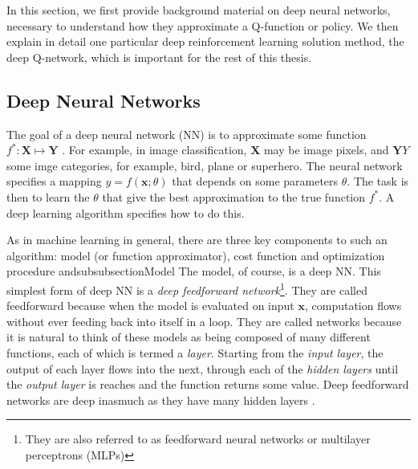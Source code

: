 \documentclass[11pt, a4paper, bibliography=totoc]{report}
\newcommand{\x}{\mathbf{x}}
\begin{document}
In this section, we first provide background material on deep neural networks, necessary to understand how they approximate a Q-function or policy. We then explain in detail one particular deep reinforcement learning solution method, the deep Q-network, which is important for the rest of this thesis.

\subsection{Deep Neural Networks} \label{sec:dnn}
The goal of a deep neural network (NN) is to approximate some function $ f^* : \textbf{X} \mapsto \textbf{Y} $ \cite{Goodfellow-et-al-2016}. For example, in image classification, $ \textbf{X} $ may be image pixels, and $ \textbf{Y}Y $ some imge categories, for example, bird, plane or superhero. The neural network specifies a mapping $ y = f(\x ; \theta) $ that depends on some parameters $ \theta $. The task is then to learn the $ \theta $ that give the best approximation to the true function $ f^* $. A deep learning algorithm specifies how to do this.

As in machine learning in general, there are three key components to such an algorithm: model (or function approximator), cost function and optimization procedure andsubsubsection{Model}
The model, of course, is a deep NN. This simplest form of deep NN is a \textit{deep feedforward network}\footnote{They are also referred to as feedforward neural networks or multilayer perceptrons (MLPs)}. They are called feedforward because when the model is evaluated on input $ \x $, computation flows without ever feeding back into itself in a loop. They are called networks because it is natural to think of these models as being composed of many different functions, each of which is termed a \textit{layer}. Starting from the \textit{input layer}, the output of each layer flows into the next, through each of the \textit{hidden layers} until the \textit{output layer} is reaches and the function returns some value. Deep feedforward networks are deep inasmuch as they have many hidden layers \cite[p.~164]{Goodfellow-et-al-2016}.
\end{document}
